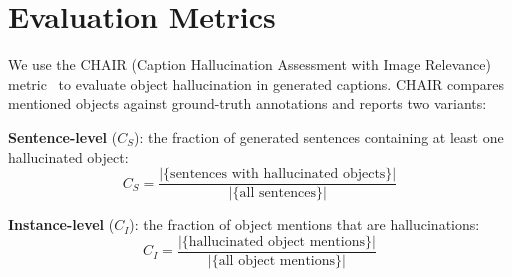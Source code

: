 \documentclass{article}
\newif\ifshowrevisions
\newenvironment{revised}{%
  \ifshowrevisions%
  \fi%
}{}
\begin{document}
\begin{revised}
\begin{table}[h]
\centering
{}
\caption{Comparison with SHIFT on CHAIR benchmark. $\dagger$Results cited from \protect\cite{wang2025shift}. Experimental settings may differ.}
\label{tab:shift_comparison}
\end{table}



\section{Evaluation Metrics}
\label{appendix:metrics}

We use the CHAIR (Caption Hallucination Assessment with Image Relevance) metric~\cite{Object_Hallucination} to evaluate object hallucination in generated captions. CHAIR compares mentioned objects against ground-truth annotations and reports two variants:

\textbf{Sentence-level} ($C_S$): the fraction of generated sentences containing at least one hallucinated object:
\begin{equation}
C_S = \frac{|\{\text{sentences with hallucinated objects}\}|}{|\{\text{all sentences}\}|}
\end{equation}

\textbf{Instance-level} ($C_I$): the fraction of object mentions that are hallucinations:
\begin{equation}
C_I = \frac{|\{\text{hallucinated object mentions}\}|}{|\{\text{all object mentions}\}|}
\end{equation}


\end{revised}
\end{document}
